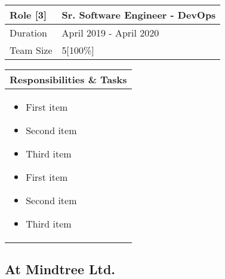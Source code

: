 \documentclass[11pt, a4paper]{article}
\begin{document}
\noindent\begin{tabular}{|p{1in}|p{5.95in}|}
\hline
\rowcolor{black!20} Role [3] & Sr. Software Engineer - DevOps\\
\hline
Duration & April 2019 - April 2020\\
\hline
Team Size & 5[100\%]\\
\hline
\end{tabular}
\newline
\vspace*{1mm}
\newline
\begin{tabular}{|p{7.122in}|}
\hline
\rowcolor{black!5} Responsibilities \& Tasks\\
\hline
\begin{itemize}[noitemsep, nolistsep]
\item First item
\item Second item
\item Third item
\item First item
\item Second item
\item Third item
\end{itemize} \\
\hline
\end{tabular}

	\subsection*{At Mindtree Ltd.}
\end{document}
